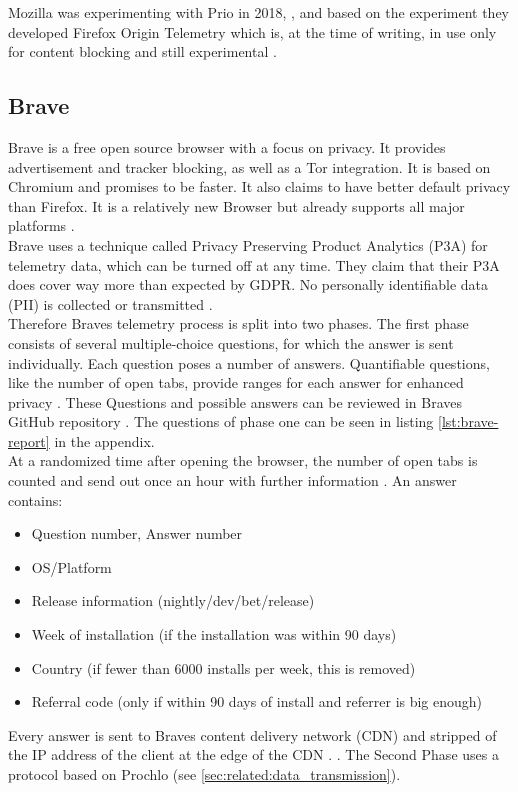         
        
    
        Mozilla was experimenting with Prio in 2018, \cite{helmer_testing_2018}, and based on the experiment they developed Firefox Origin Telemetry  \cite{englehardt_next_2019} which is, at the time of writing, in use only for content blocking and still experimental \cite{noauthor_origin_nodate}.\\
    
    
    \subsection{Brave}
        Brave is a free open source browser with a focus on privacy. It provides advertisement and tracker blocking, as well as a Tor integration. It is based on Chromium and promises to be faster. It also claims to have better default privacy than Firefox. It is a relatively new Browser but already supports all major platforms \cite{brave_secure_nodate}.\\
        Brave uses a technique called Privacy Preserving Product Analytics (P3A) for telemetry data, which can be turned off at any time.
        They claim that their P3A does cover way more than expected by GDPR. No personally identifiable data (PII) is collected or transmitted \cite{brave_privacy-preserving_2019}.\\
        Therefore Braves telemetry process is split into two phases. The first phase consists of several multiple-choice questions, for which the answer is sent individually.
        Each question poses a number of answers. Quantifiable questions, like the number of open tabs, provide ranges for each answer for enhanced privacy \cite{brave_privacy-preserving_2019}. These Questions and possible answers can be reviewed in Braves GitHub repository \cite{brave_software_inc_brave-browser_2019}.
        The questions of phase one can be seen in listing \ref{lst:brave-report} in the appendix.\\
        At a randomized time after opening the browser, the number of open tabs is counted and send out once an hour with further information \cite{brave_privacy-preserving_2019}.
        An answer contains:
        \begin{itemize}
            \item Question number, Answer number
            \item OS/Platform
            \item Release information (nightly/dev/bet/release)
            \item Week of installation (if the installation was within 90 days)
            \item Country (if fewer than 6000 installs per week, this is removed)
            \item Referral code (only if within 90 days of install and referrer is big enough)
        \end{itemize}
        Every answer is sent to Braves content delivery network (CDN) and stripped of the IP address of the client at the edge of the CDN \cite{brave_privacy-preserving_2019}.
        . 
        The Second Phase uses a protocol based on Prochlo (see \ref{sec:related:data_transmission}). 
        
